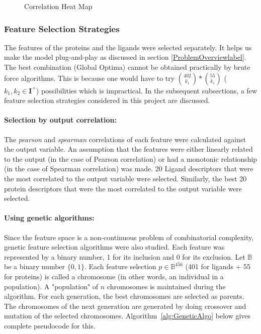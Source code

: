 \documentclass[11pt]{article}
\begin{document}
\begin{figure}[htb]
\begin{subfigure}[b]{0.45\textwidth}
        \label{fig:correlationfr}
     \end{subfigure}
     \caption{Correlation Heat Map}
     \label{fig:correlationheatmap}
\end{figure}

\subsubsection{Feature Selection Strategies}


The features of the proteins and the ligands were selected separately.
It helps us make the model plug-and-play as discussed in section \ref{ProblemOverviewlabel}.
The best combination (Global Optima) cannot be obtained practically by brute force algorithms.
This is because one would have to try $\binom{402}{k_1} * \binom{55}{k_1}$ ($k_1, k_2 \in \mathbf{I}^+$) possibilities which is impractical.
In the subsequent subsections, a few feature selection strategies considered in this project are discussed.

\paragraph{Selection by output correlation:}
The \textit{pearson} and \textit{spearman} correlations of each feature were calculated against the output variable.
An assumption that the features were either linearly related to the output (in the case of Pearson correlation) or had a monotonic relationship (in the case of Spearman correlation) was made.
20 Ligand descriptors that were the most correlated to the output variable were selected.  Similarly, the best 20 protein descriptors that were the most correlated to the output variable were selected.

\paragraph{Using genetic algorithms:}
\label{geneticalgorithmssection}
Since the feature space is a non-continuous problem of combinatorial complexity, genetic feature selection algorithms \cite{genetic_algorithm} were also studied.
Each feature was represented by a binary number, 1 for its inclusion and 0 for its exclusion.
Let $\mathbb{B}$ be a binary number $\{0,  1\}$.
Each feature selection $p \in \mathbb{B}^{456}$ (401 for ligands + 55 for proteins) is called a chromosome (in other words, an individual in a population).
A "population" of $n$ chromosomes is maintained during the algorithm.
For each generation,  the best chromosomes are selected as parents.
The chromosomes of the next generation are generated by doing crossover and mutation of the selected chromosomes.
Algorithm~\ref{alg:GeneticAlgo} below gives complete pseudocode for this.
\end{document}
